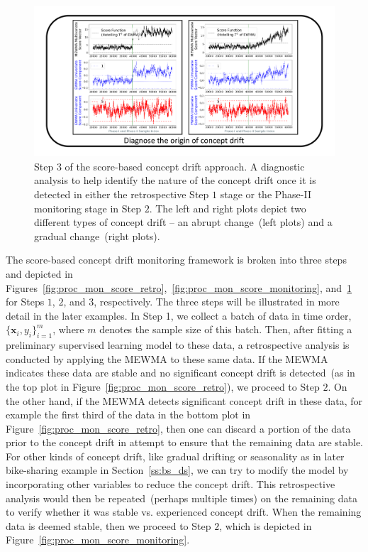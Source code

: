 \documentclass[twoside,11pt]{article}
\begin{document}
\begin{figure}
\centering
\includegraphics[width = 1\linewidth, trim=.35in .20in .35in .20in, clip]{../figures/v14/flow_chart/Diagnose_1.png}
\caption{Step $3$ of the score-based concept drift approach. A diagnostic analysis to help identify the nature of the concept drift once it is detected in either the retrospective Step $1$ stage or the Phase-II monitoring stage in Step $2$. The left and right plots depict two different types of concept drift -- an abrupt change~(left plots) and a gradual change~(right plots).}
\label{fig:proc_mon_score_diagnosis}
\end{figure}

The score-based concept drift monitoring framework is broken into three steps and depicted in Figures~\ref{fig:proc_mon_score_retro},~\ref{fig:proc_mon_score_monitoring}, and~\ref{fig:proc_mon_score_diagnosis} for Steps $1$, $2$, and $3$, respectively. The three steps will be illustrated in more detail in the later examples. In Step 1, we collect a batch of data in time order, $\{\bm {x}_i, y_i\} _{i=1} ^{m}$, where $m$ denotes the sample size of this batch. Then, after fitting a preliminary supervised learning model to these data, a retrospective analysis is conducted by applying the MEWMA to these same data. If the MEWMA indicates these data are stable and no significant concept drift is detected~(as in the top plot in Figure~\ref{fig:proc_mon_score_retro}), we proceed to Step $2$. On the other hand, if the MEWMA detects significant concept drift in these data, for example the first third of the data in the bottom plot in Figure~\ref{fig:proc_mon_score_retro}, then one can discard a portion of the data prior to the concept drift in attempt to ensure that the remaining data are stable. For other kinds of concept drift, like gradual drifting or seasonality as in later bike-sharing example in Section~\ref{ss:bs_ds}, we can try to modify the model by incorporating other variables to reduce the concept drift. This retrospective analysis would then be repeated~(perhaps multiple times) on the remaining data to verify whether it was stable vs. experienced concept drift. When the remaining data is deemed stable, then we proceed to Step $2$, which is depicted in Figure~\ref{fig:proc_mon_score_monitoring}.
\end{document}
